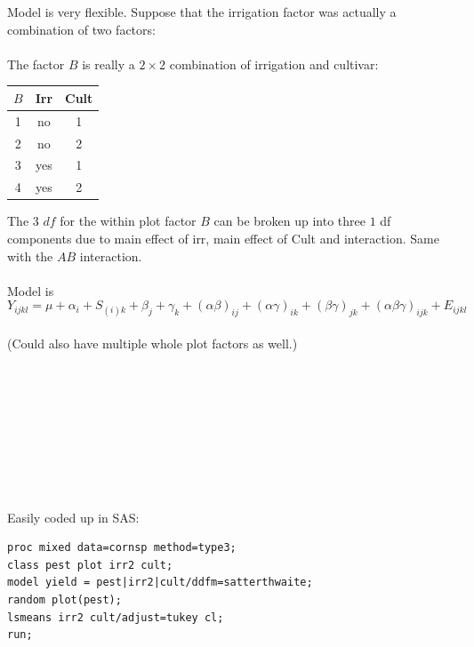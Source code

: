 Model is very flexible.  Suppose that the irrigation factor was actually a combination of two factors:\\~\\
The factor $B$ is really a $2 \times 2$ combination of irrigation and cultivar:
\begin{center}
\begin{tabular}{ccc}
$B$ & Irr & Cult \\ \hline
1 & no & 1 \\
2 & no & 2 \\
3 & yes  & 1 \\
4 & yes  & 2 \\ \hline
\end{tabular}
\end{center}
The 3 $df$ for the within plot factor $B$ can be broken up into three $1$ df components due to main effect of irr, main effect of Cult and interaction.  Same with the $AB$ interaction.  \\~\\
Model is
$$Y_{ijkl}=\mu+\alpha_i+S_{(i)k}+\beta_j+\gamma_k+(\alpha\beta)_{ij}+(\alpha\gamma)_{ik}+(\beta\gamma)_{jk}+(\alpha\beta\gamma)_{ijk}+E_{ijkl}$$~\\
(Could also have multiple whole plot factors as well.)\\~\\~\\~\\~\\~\\~\\~\\~\\~\\
Easily coded up in SAS:
\begin{small}
\begin{verbatim}
proc mixed data=cornsp method=type3;
class pest plot irr2 cult;
model yield = pest|irr2|cult/ddfm=satterthwaite;
random plot(pest);
lsmeans irr2 cult/adjust=tukey cl;
run;
\end{verbatim}
\end{small}
 
\newpage

